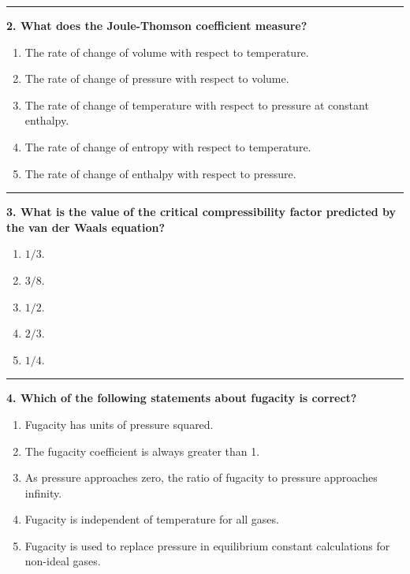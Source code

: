\documentclass[
  9pt,
]{extbook}
\providecommand{\tightlist}{%
  \setlength{\itemsep}{0pt}\setlength{\parskip}{0pt}}
\theoremstyle{definition}
\theoremstyle{definition}
\theoremstyle{definition}
\theoremstyle{remark}
\begin{document}
\begin{center}\rule{0.5\linewidth}{0.5pt}\end{center}

\textbf{2. What does the Joule-Thomson coefficient measure?}

\begin{enumerate}
\def\labelenumi{\alph{enumi}.}
\tightlist
\item
  The rate of change of volume with respect to temperature.
\item
  The rate of change of pressure with respect to volume.
\item
  The rate of change of temperature with respect to pressure at constant enthalpy.
\item
  The rate of change of entropy with respect to temperature.
\item
  The rate of change of enthalpy with respect to pressure.
\end{enumerate}

\begin{center}\rule{0.5\linewidth}{0.5pt}\end{center}

\textbf{3. What is the value of the critical compressibility factor predicted by the van der Waals equation?}

\begin{enumerate}
\def\labelenumi{\alph{enumi}.}
\tightlist
\item
  \(1/3\).
\item
  \(3/8\).
\item
  \(1/2\).
\item
  \(2/3\).
\item
  \(1/4\).
\end{enumerate}

\begin{center}\rule{0.5\linewidth}{0.5pt}\end{center}

\textbf{4. Which of the following statements about fugacity is correct?}

\begin{enumerate}
\def\labelenumi{\alph{enumi}.}
\tightlist
\item
  Fugacity has units of pressure squared.
\item
  The fugacity coefficient is always greater than 1.
\item
  As pressure approaches zero, the ratio of fugacity to pressure approaches infinity.
\item
  Fugacity is independent of temperature for all gases.
\item
  Fugacity is used to replace pressure in equilibrium constant calculations for non-ideal gases.
\end{enumerate}
\end{document}
